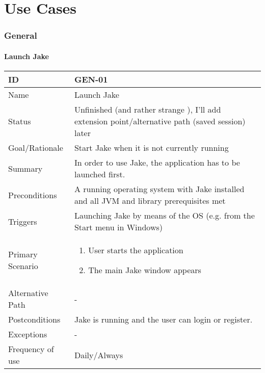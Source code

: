 \part{Use Cases}
\section{General}

\def\ucreset{
\def\ucid{-}
\def\ucname{-}
\def\ucstatus{-} %
\def\ucrationale{-}
\def\ucsummary{-}
\def\ucpreconditions{-}
\def\uctriggers{-}
\def\ucprimaryscenario{-}
\def\ucalternativepath{-}
\def\ucexceptions{-}
\def\ucpostconditions{-}
\def\ucfrequency{-}
}

\def\ucprint{
\subsection{\ucname}
\begin{tabular}{|p{3cm}|p{12cm}|}
\hline
ID & \ucid \\ 
\hline 
Name & \ucname \\
\hline
Status & \ucstatus \\ 
\hline 
Goal/Rationale & \ucrationale \\ 
\hline 
Summary & \ucsummary \\ 
\hline
Preconditions & \ucpreconditions \\
\hline
Triggers & \uctriggers \\
\hline
Primary Scenario & \ucprimaryscenario \\
\hline
Alternative Path & \ucalternativepath \\
\hline
Postconditions & \ucpostconditions  \\
\hline
Exceptions & \ucexceptions \\
\hline
Frequency of use & \ucfrequency  \\
\hline
\end{tabular}
}


\ucreset
\def\ucid{GEN-01}
\def\ucname{Launch Jake}
\def\ucstatus{Unfinished (and rather strange ), I'll add extension point/alternative path (saved session) later} %
\def\ucrationale{Start Jake when it is not currently running}
\def\ucsummary{In order to use Jake, the application has to be launched first.}
\def\ucpreconditions{A running operating system with Jake installed and all JVM and library prerequisites met}
\def\uctriggers{Launching Jake by means of the OS (e.g. from the Start menu in Windows)}
\def\ucprimaryscenario{
\begin{enumerate}
\item User starts the application
\item The main Jake window appears
\end{enumerate}}
\def\ucpostconditions{Jake is running and the user can login or register.}
\def\ucfrequency{Daily/Always}
\ucprint

